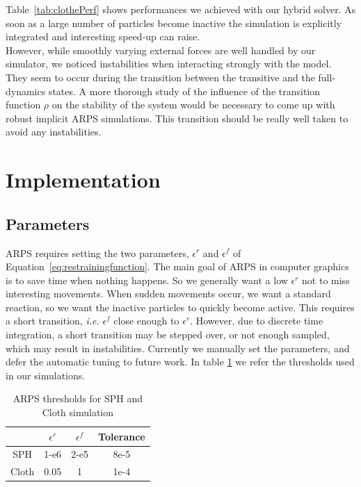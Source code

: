 Table~\ref{tab:clothePerf} shows performances we achieved with our hybrid solver.
As soon as a large number of particles become inactive the simulation is explicitly integrated and interesting speed-up can raise.
\\
However, while smoothly varying external forces are well handled by our simulator, we noticed instabilities when interacting strongly with the model.
They seem to occur during the transition between the transitive and the full-dynamics states.
A more thorough study of the influence of the transition function $\rho$ on the stability of the system would be necessary to come up with robust implicit ARPS simulations.
 This transition should be really well taken to avoid any instabilities.

\section{Implementation} 
\label{sec:arps_implementation}

\subsection{ Parameters }
ARPS requires setting the two parameters, $\epsilon^{r}$ and $\epsilon^{f}$ of Equation~\ref{eq:restrainingfunction}.
The main goal of ARPS in computer graphics is to save time when nothing happens.
So we generally want a low $\epsilon^{r}$ not to miss interesting movements.
When sudden movements occur, we want a standard reaction, so we want the inactive particles to quickly become active.
This requires a short transition, \textit{i.e.} $\epsilon^{f}$ close enough to $\epsilon^{r}$.
However, due to discrete time integration, a short transition may be stepped over, or not enough sampled, which may result in instabilities.
Currently we manually set the parameters, and defer the automatic tuning to future work.
In table \ref{tab:parameters} we refer the thresholds used in our simulations.
\begin{table}[htb]
    \centering
    \begin{tabular}{|c|c|c|c|} \hline
                & $\epsilon^{r}$    & $\epsilon^{f}$ & Tolerance \\ \hline
        SPH     &   1-e6            & 2-e5          & 8e-5 \\ \hline
        Cloth  &   0.05            & 1             & 1e-4 \\ \hline
\end{tabular}
    \caption[ARPS: Parameters for ARPS solver]{\label{tab:parameters} ARPS thresholds for SPH and Cloth simulation}
\end{table}

